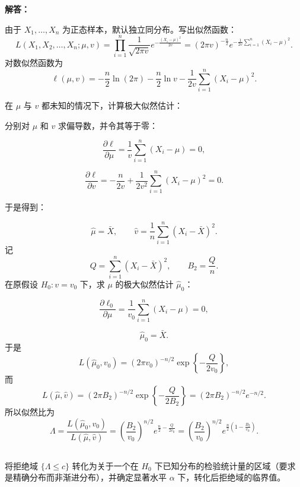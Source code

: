 \documentclass[12pt,a4paper]{article}
\begin{document}
\begin{answerbox}
\textbf{解答：}

由于 $X_1,\ldots,X_n$ 为正态样本，默认独立同分布。写出似然函数：
\[
L(X_1, X_2, \ldots, X_n; \mu, v) = \prod_{i=1}^n \frac{1}{\sqrt{2\pi v}} e^{-\frac{(X_i-\mu)^2}{2v}} = (2\pi v)^{-\frac{n}{2}} e^{-\frac{1}{2v} \sum_{i=1}^n (X_i-\mu)^2}.
\]
对数似然函数为
\[
\ell(\mu,v)=-\frac n2\ln(2\pi)-\frac n2\ln v-
\frac{1}{2v}\sum_{i=1}^n(X_i-\mu)^2.
\]

在 $\mu$ 与 $v$ 都未知的情况下，计算极大似然估计：

分别对 $\mu$ 和 $v$ 求偏导数，并令其等于零：

$$
\frac{\partial \ell}{\partial \mu} = \frac{1}{v} \sum_{i=1}^n (X_i-\mu) = 0,
$$

$$
\frac{\partial \ell}{\partial v} = -\frac{n}{2v} + \frac{1}{2v^2} \sum_{i=1}^n (X_i-\mu)^2 = 0.
$$

于是得到：

\[
\hat\mu=\bar X,
\qquad
\hat v=\frac{1}{n}\sum_{i=1}^n(X_i-\bar X)^2.
\]
记
\[
Q=\sum_{i=1}^n(X_i-\bar X)^2,
\qquad B_2=\frac{Q}{n}.
\]
在原假设 $H_0:v=v_0$ 下，求 $\mu$ 的极大似然估计 $\hat{\mu}_0$：

$$
\frac{\partial \ell_0}{\partial \mu} = \frac{1}{v_0} \sum_{i=1}^n (X_i-\mu) = 0,
$$

\[
\hat\mu_0=\bar X.
\]
于是
\[
L(\hat\mu_0,v_0)=(2\pi v_0)^{-n/2}\exp\left\{-\frac{Q}{2v_0}\right\},
\]
而
\[
L(\hat\mu,\hat v)=(2\pi B_2)^{-n/2}\exp\left\{-\frac{Q}{2B_2}\right\}
=(2\pi B_2)^{-n/2}e^{-n/2}.
\]
所以似然比为
\[
\Lambda
=\frac{L(\hat\mu_0,v_0)}{L(\hat\mu,\hat v)}
=\left(\frac{B_2}{v_0}\right)^{n/2}
e^{\frac n2-\frac{Q}{2v_0}}
=\left(\frac{B_2}{v_0}\right)^{n/2}
e^{\frac n2\left(1-\frac{B_2}{v_0}\right)}.
\]
\end{answerbox}
\subsection{}

将拒绝域 $\{\Lambda\leq c\}$ 转化为关于一个在 $H_0$ 下已知分布的检验统计量的区域（要求是精确分布而非渐进分布），并确定显著水平 $\alpha$ 下，转化后拒绝域的临界值。
\end{document}
